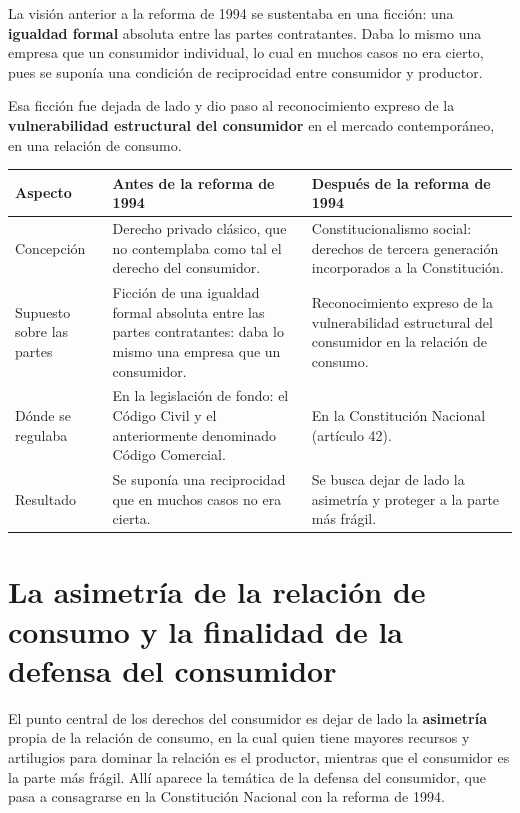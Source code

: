 \documentclass[12pt,oneside]{book}
\begin{document}
La visi\'on anterior a la reforma de 1994 se sustentaba en una ficci\'on: una \textbf{igualdad formal} absoluta entre las partes contratantes. Daba lo mismo una empresa que un consumidor individual, lo cual en muchos casos no era cierto, pues se supon\'ia una condici\'on de reciprocidad entre consumidor y productor.

Esa ficci\'on fue dejada de lado y dio paso al reconocimiento expreso de la \textbf{vulnerabilidad estructural del consumidor} en el mercado contempor\'aneo, en una relaci\'on de consumo.

\begin{center}
{\small\renewcommand{\arraystretch}{1.25}
\begin{tabularx}{\textwidth}{@{}B{0.18\textwidth} Y Y@{}}
\toprule
\textbf{Aspecto} & \textbf{Antes de la reforma de 1994} & \textbf{Despu\'es de la reforma de 1994} \\
\midrule
Concepci\'on & Derecho privado cl\'asico, que no contemplaba como tal el derecho del consumidor. & Constitucionalismo social: derechos de tercera generaci\'on incorporados a la Constituci\'on. \\
\addlinespace
Supuesto sobre las partes & Ficci\'on de una igualdad formal absoluta entre las partes contratantes: daba lo mismo una empresa que un consumidor. & Reconocimiento expreso de la vulnerabilidad estructural del consumidor en la relaci\'on de consumo. \\
\addlinespace
D\'onde se regulaba & En la legislaci\'on de fondo: el C\'odigo Civil y el anteriormente denominado C\'odigo Comercial. & En la Constituci\'on Nacional (art\'iculo 42). \\
\addlinespace
Resultado & Se supon\'ia una reciprocidad que en muchos casos no era cierta. & Se busca dejar de lado la asimetr\'ia y proteger a la parte m\'as fr\'agil. \\
\bottomrule
\end{tabularx}}
\end{center}

\section{La asimetr\'ia de la relaci\'on de consumo y la finalidad de la defensa del consumidor}

El punto central de los derechos del consumidor es dejar de lado la \textbf{asimetr\'ia} propia de la relaci\'on de consumo, en la cual quien tiene mayores recursos y artilugios para dominar la relaci\'on es el productor, mientras que el consumidor es la parte m\'as fr\'agil. All\'i aparece la tem\'atica de la defensa del consumidor, que pasa a consagrarse en la Constituci\'on Nacional con la reforma de 1994.
\end{document}
